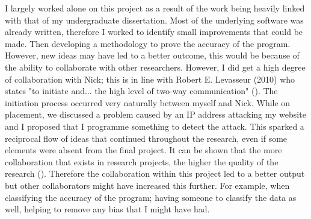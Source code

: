 I largely worked alone on this project as a result of the work being heavily linked with that of my undergraduate dissertation. Most of the underlying software was already written, therefore I worked to identify small improvements that could be made. Then developing a methodology to prove the accuracy of the program. However, new ideas may have led to a better outcome, this would be because of the ability to collaborate with other researchers. However, I did get a high degree of collaboration with Nick; this is in line with Robert E. Levasseur (2010) who states "to initiate and... the high level of two-way communication" (\cite{levasseur2010people}). The initiation process occurred very naturally between myself and Nick. While on placement, we discussed a problem caused by an IP address attacking my website and I proposed that I programme something to detect the attack. This sparked a reciprocal flow of ideas that continued throughout the research, even if some elements were absent from the final project. It can be shown that the more collaboration that exists in research projects, the higher the quality of the research (\cite{figg2006scientific}). Therefore the collaboration within this project led to a better output but other collaborators might have increased this further. For example, when classifying the accuracy of the program; having someone to classify the data as well, helping to remove any bias that I might have had.




